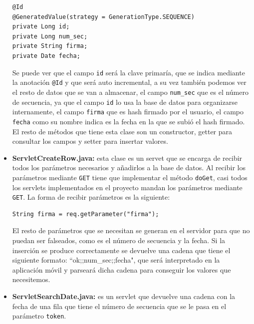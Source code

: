 \begin{itemize}
\begin{lstlisting}[style=Java]
@Id
@GeneratedValue(strategy = GenerationType.SEQUENCE)
private Long id;
private Long num_sec;
private String firma;
private Date fecha;
\end{lstlisting}

Se puede ver que el campo \lstinline{id} será la clave primaría, que se indica mediante la anotación \lstinline{@Id} y que será auto incremental, a su vez también podemos ver el resto de datos que se van a almacenar, el campo \lstinline{num_sec} que es el número de secuencia, ya que el campo \lstinline{id} lo usa la base de datos para organizarse internamente, el campo \lstinline{firma} que es hash firmado por el usuario, el campo \lstinline{fecha} como su nombre indica es la fecha en la que se subió el hash firmado. El resto de métodos que tiene esta clase son un constructor, getter para consultar los campos y setter para insertar valores.

\item \textbf{ServletCreateRow.java:} esta clase es un servet que se encarga de recibir todos los parámetros necesarios y añadirlos a la base de datos. Al recibir los parámetros mediante \lstinline{GET} tiene que implementar el método \lstinline{doGet}, casi todos los servlets implementados en el proyecto mandan los parámetros mediante \lstinline{GET}. La forma de recibir parámetros es la siguiente:

\begin{lstlisting}[style=Java]
String firma = req.getParameter("firma");
\end{lstlisting}

El resto de parámetros que se necesitan se generan en el servidor para que no puedan ser falseados, como es el número de secuencia y la fecha. Si la inserción se produce correctamente se devuelve una cadena que tiene el siguiente formato: ``ok;;num\_sec;;fecha", que será interpretado en la aplicación móvil y parseará dicha cadena para conseguir los valores que necesitemos.


\item \textbf{ServletSearchDate.java:} es un servlet que devuelve una cadena con la fecha de una fila que tiene el número de secuencia que se le pasa en el parámetro \lstinline{token}.


\end{itemize}
